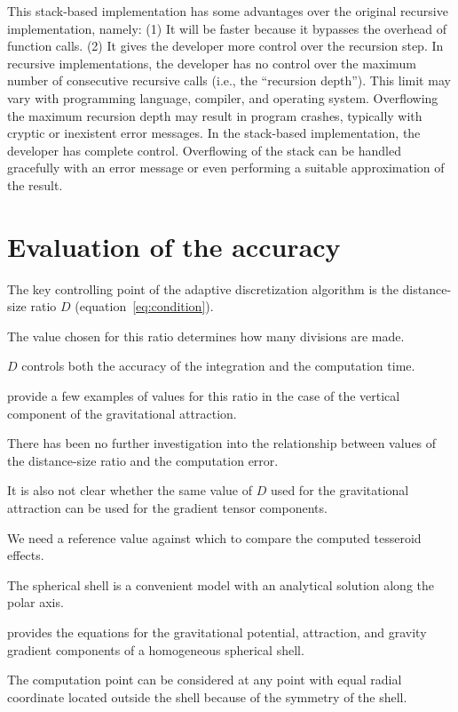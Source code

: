 \documentclass[paper,twocolumn]{geophysics}
\begin{document}
This stack-based implementation
has some advantages over the original recursive implementation,
namely:
(1) It will be faster because it bypasses the overhead of function calls.
(2) It gives the developer more control over the recursion step.
In recursive implementations,
the developer has no control over
the maximum number of consecutive recursive calls
(i.e., the ``recursion depth'').
This limit may vary with programming language,
compiler, and operating system.
Overflowing the maximum recursion depth
may result in program crashes,
typically with cryptic or inexistent error messages.
In the stack-based implementation,
the developer has complete control.
Overflowing of the stack can be handled gracefully
with an error message
or even performing a suitable approximation of the result.


\section{Evaluation of the accuracy}

The key controlling point of the adaptive discretization algorithm
is the distance-size ratio $D$ (equation~\ref{eq:condition}).

The value chosen for this ratio determines how many divisions are made.

$D$ controls both the accuracy of the integration and the computation time.

\citet{Li2011} provide a few examples of values for this ratio in the case of
the vertical component of the gravitational attraction.

There has been no further investigation into
the relationship between values of the distance-size ratio and
the computation error.

It is also not clear whether the same value of $D$ used for the gravitational
attraction can be used for the gradient tensor components.



We need a reference value against which to compare the computed tesseroid effects.

The spherical shell is a convenient model with an analytical solution along
the polar axis.

\citep{Grombein2013} provides the equations for
the gravitational potential, attraction, and gravity gradient components
of a homogeneous spherical shell.

The computation point can be considered at any point with equal radial
coordinate located outside the shell because of the symmetry of the shell.
\end{document}

